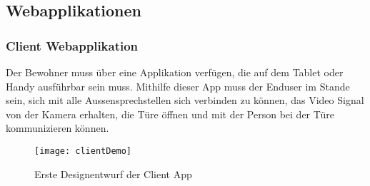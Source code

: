 \subsection{Webapplikationen}

\subsubsection{Client Webapplikation}
Der Bewohner muss über eine Applikation verfügen, die auf dem Tablet oder Handy ausführbar sein muss. Mithilfe dieser App muss der Enduser im Stande sein, sich mit alle Aussensprechstellen sich verbinden zu können, das Video Signal von der Kamera erhalten, die Türe öffnen und mit der Person bei der Türe kommunizieren können.
\\
\begin{figure}[htb!]
	\begin{center}
		\texttt{[image: clientDemo]}
		\caption[Erste Designentwurf der Client App]{Erste Designentwurf der Client App}
		\label{fig:clientDemo}
	\end{center}
\end{figure}



\newpage
